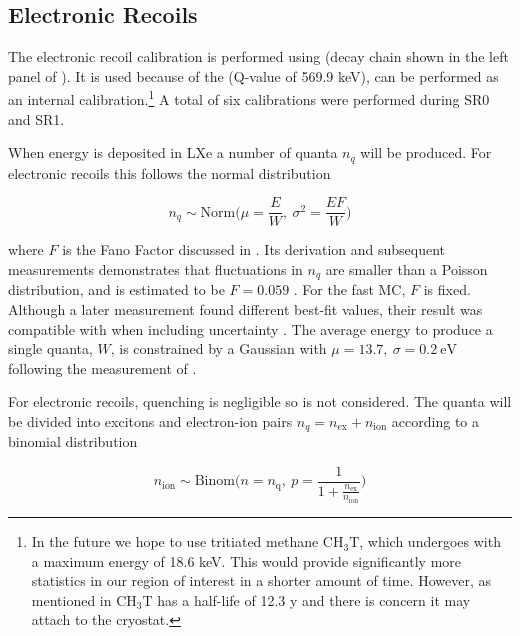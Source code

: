 \subsection{Electronic Recoils}
\label{subsec:er_nr_calibrations_parameter_determ_er}
The electronic recoil calibration is performed using  (decay chain shown in the left panel of
).  It is used because of the  \betadecay (Q-value of 569.9 keV), can
be performed as an internal calibration.\footnote{In the future we hope to use tritiated methane $\mathrm{C H_3 T}$, which undergoes
\betadecay
with a maximum energy of 18.6 keV.  This would provide significantly more statistics in our region of interest in a shorter amount
of time.  However, as mentioned in  $\mathrm{C H_3 T}$ has a half-life of 12.3 y and there
is concern it may attach to the cryostat.}  A total of six calibrations were
performed during SR0 and SR1.

When energy is deposited in LXe a number of quanta $n_q$ will be produced.  For electronic recoils this follows the normal distribution

\begin{equation}
n_q \sim \mathrm{Norm} \bigg( \mu = \frac{E}{W},\ \sigma^2 = \frac{E F}{W} \bigg)
\label{eq:er_nr_calibrations_parameter_determ_er_quanta}
\end{equation}

\noindent where $F$ is the Fano Factor  discussed in .  Its derivation and subsequent measurements
demonstrates that fluctuations in $n_q$ are smaller than a Poisson distribution, and is estimated to be $F = 0.059$
.  For the
fast MC, $F$ is fixed.  Although a later measurement found different best-fit values, their result was
compatible with  when including uncertainty .  The average energy to produce a single
quanta, $W$, is constrained by a Gaussian with $\mu = 13.7,\ \sigma = 0.2\ \mathrm{eV}$ following the measurement of .

For electronic recoils, quenching is negligible so is not considered.  The quanta will be divided into excitons and electron-ion pairs
$n_q = n_{\mathrm{ex}} + n_{\mathrm{ion}}$ according to a binomial distribution

\vspace{-10pt}

\begin{equation}
n_{\mathrm{ion}} \sim \mathrm{Binom} \Bigg(n = n_{\mathrm{q}},\ p = \frac{1}{1 + \frac{n_{\mathrm{ex}}}{n_{\mathrm{ion}}}} \Bigg)
\label{eq:er_nr_calibrations_parameter_determ_er_nions}
\end{equation}

